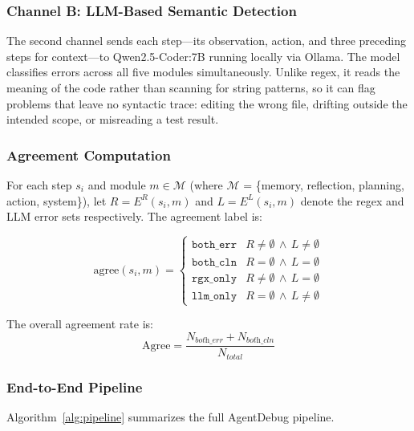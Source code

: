 \documentclass{ieeeaccess}
\begin{document}
\subsubsection{Channel B: LLM-Based Semantic Detection}

The second channel sends each step---its observation, action, and three preceding steps for context---to Qwen2.5-Coder:7B running locally via Ollama. The model classifies errors across all five modules simultaneously. Unlike regex, it reads the meaning of the code rather than scanning for string patterns, so it can flag problems that leave no syntactic trace: editing the wrong file, drifting outside the intended scope, or misreading a test result.

\subsubsection{Agreement Computation}

For each step $s_i$ and module $m \in \mathcal{M}$ (where $\mathcal{M}$ = \{memory, reflection, planning, action, system\}), let $R = E^R(s_i, m)$ and $L = E^L(s_i, m)$ denote the regex and LLM error sets respectively. The agreement label is:

\begin{equation}
\text{agree}(s_i, m) \!=\! \begin{cases}
\texttt{both\_err} & R \!\neq\! \emptyset \,\wedge\, L \!\neq\! \emptyset \\
\texttt{both\_cln} & R \!=\! \emptyset \,\wedge\, L \!=\! \emptyset \\
\texttt{rgx\_only} & R \!\neq\! \emptyset \,\wedge\, L \!=\! \emptyset \\
\texttt{llm\_only} & R \!=\! \emptyset \,\wedge\, L \!\neq\! \emptyset
\end{cases}
\end{equation}

The overall agreement rate is:
\begin{equation}
\text{Agree} = \frac{N_{\textit{both\_err}} + N_{\textit{both\_cln}}}{N_{\textit{total}}}
\end{equation}

\subsubsection{End-to-End Pipeline}

Algorithm~\ref{alg:pipeline} summarizes the full AgentDebug pipeline.
\end{document}
